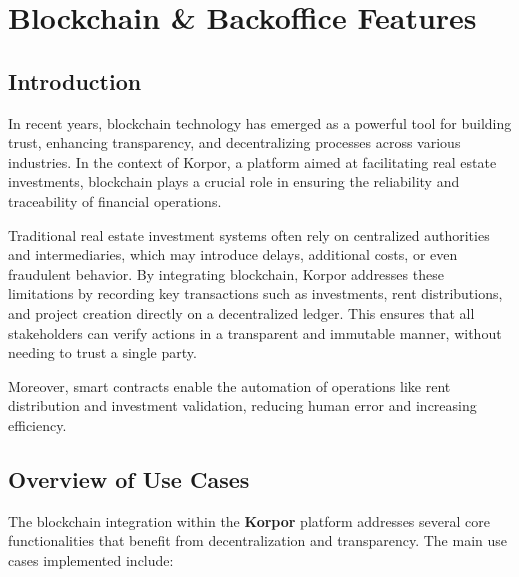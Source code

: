 \chapter{Blockchain \& Backoffice Features}

\section*{Introduction}

In recent years, blockchain technology has emerged as a powerful tool for building trust, enhancing transparency, and decentralizing processes across various industries. In the context of Korpor, a platform aimed at facilitating real estate investments, blockchain plays a crucial role in ensuring the reliability and traceability of financial operations.

Traditional real estate investment systems often rely on centralized authorities and intermediaries, which may introduce delays, additional costs, or even fraudulent behavior. By integrating blockchain, Korpor addresses these limitations by recording key transactions such as investments, rent distributions, and project creation directly on a decentralized ledger. This ensures that all stakeholders can verify actions in a transparent and immutable manner, without needing to trust a single party.

Moreover, smart contracts enable the automation of operations like rent distribution and investment validation, reducing human error and increasing efficiency.

\section{Overview of Use Cases}

The blockchain integration within the \textbf{\textcolor{primary}{Korpor}} platform addresses several core functionalities that benefit from decentralization and transparency. The main use cases implemented include:

